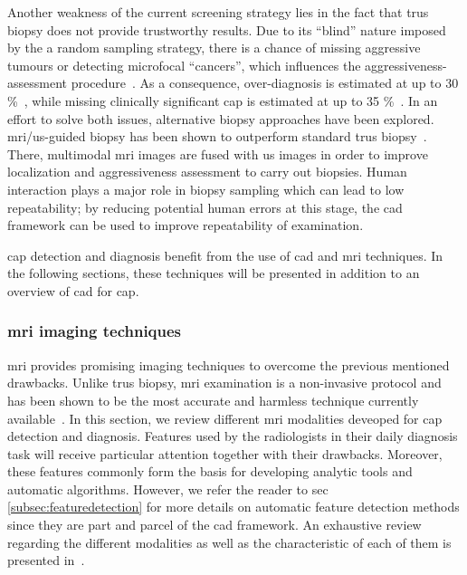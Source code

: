 Another weakness of the current screening strategy lies in the fact that \ac{trus} biopsy does not provide trustworthy results. Due to its ``blind'' nature imposed by the a random sampling strategy, there is a chance of missing aggressive tumours or detecting microfocal ``cancers'', which influences the aggressiveness-assessment procedure~\cite{Noguchi2001}. As a consequence, over-diagnosis is estimated at up to 30 \%~\cite{Haas2007}, while missing clinically significant \ac{cap} is estimated at up to 35 \%~\cite{Taira2010}. In an effort to solve both issues, alternative biopsy approaches have been explored. \ac{mri}/\ac{us}-guided biopsy has been shown to outperform standard \ac{trus} biopsy~\cite{Delongchamps2013}. There, multimodal \ac{mri} images are fused with \ac{us} images in order to improve localization and aggressiveness assessment to carry out biopsies. Human interaction plays a major role in biopsy sampling which can lead to low repeatability; by reducing potential human errors at this stage, the \acs{cad} framework can be used to improve repeatability of examination.

\ac{cap} detection and diagnosis benefit from the use of \acs{cad} and \ac{mri} techniques. In the following sections, these techniques will be presented in addition to an overview of \acs{cad} for \ac{cap}.

\subsubsection{\ac{mri} imaging techniques}\label{subsubsec:mrimrsi}

\ac{mri} provides promising imaging techniques to overcome the previous mentioned drawbacks. Unlike \ac{trus} biopsy, \ac{mri} examination is a non-invasive protocol and has been shown to be the most accurate and harmless technique currently available~\cite{Turkbey2012}. In this section, we review different \ac{mri} modalities deveoped for \ac{cap} detection and diagnosis. Features used by the radiologists in their daily diagnosis task will receive particular attention together with their drawbacks. Moreover, these features commonly form the basis for developing analytic tools and automatic algorithms. However, we refer the reader to \acs{sec}\,\ref{subsec:featuredetection} for more details on automatic feature detection methods since they are part and parcel of the \acs{cad} framework. An exhaustive review regarding the different modalities as well as the characteristic of each of them is presented in~\cite{Barentsz2012}.

